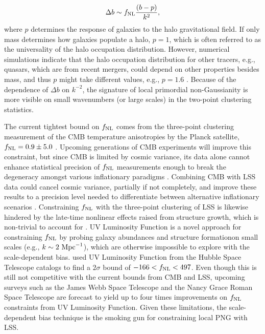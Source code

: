 \begin{equation}\label{eq:db}
\Delta b \sim f_{\rm NL} \frac{(b - p)}{k^{2}},
\end{equation}
where $p$ determines the response of galaxies to the halo gravitational field. If only mass determines how galaxies populate a halo, $p=1$, which is often referred to as the universality of the halo occupation distribution. However, numerical simulations indicate that the halo occupation distribution for other tracers, e.g., quasars, which are from recent mergers, could depend on other properties besides mass, and thus $p$ might take different values, e.g., $p=1.6$ \citep{slosar2008constraints}. Because of the dependence of $\Delta b$ on $k^{-2}$, the signature of local primordial non-Gaussianity is more visible on small wavenumbers (or large scales) in the two-point clustering statistics. 

The current tightest bound on $f_{\rm NL}$ comes from the three-point clustering measurement of the CMB temperature anisotropies by the Planck satellite, $f_{\rm NL}=0.9\pm 5.0$ \citep{akrami2019planck}. Upcoming generations of CMB experiments will improve this constraint, but since CMB is limited by cosmic variance, its data alone cannot enhance statistical precision of $f_{\rm NL}$ measurements enough to break the degeneracy amongst various inflationary paradigms \citep[see, e.g.,][]{ade2019simons}. Combining CMB with LSS data could cancel cosmic variance, partially if not completely, and improve these results to a precision level needed to differentiate between alternative inflationary scenarios \citep[see, e.g.,][]{schmittfull2018PhRvD}. Constraining $f_{\rm NL}$ with the three-point clustering of LSS is likewise hindered by the late-time nonlinear effects raised from structure growth, which is non-trivial to account for \citep{baldauf2011galaxy, baldauf2011primordial}. UV Luminosity Function is a novel approach for constraining $f_{\rm NL}$ by probing galaxy abundances and structure formationon small scales (e.g., $k \sim 2~{\rm Mpc}^{-1}$), which are otherwise impossible to explore with the scale-dependent bias. \cite{sabti2021JCAP} used UV Luminosity Function from the Hubble Space Telescope catalogs \citep{bouwens2015ApJ} to find a $2\sigma$ bound of $-166<f_{\rm NL}<497$. Even though this is still not competitive with the current bounds from CMB and LSS, upcoming surveys such as the James Webb Space Telescope and the Nancy Grace Roman Space Telescope are forecast to yield up to four times improvements on $
f_{\rm NL}$ constraints from UV Luminosity Function. Given these limitations, the scale-dependent bias technique is the smoking gun for constraining local PNG with LSS. 

